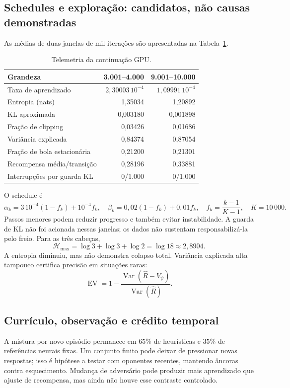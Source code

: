 \documentclass[11pt,a4paper]{article}
\begin{document}
\subsection{Schedules e exploração: candidatos, não causas demonstradas}
As médias de duas janelas de mil iterações são apresentadas na Tabela~\ref{tab:diag}.
\begin{table}[htbp]\centering\small
\caption{Telemetria da continuação GPU.}\label{tab:diag}
\begin{tabular}{@{}lrr@{}}\toprule
Grandeza & 3.001--4.000 & 9.001--10.000\\\midrule
Taxa de aprendizado & $2{,}30003\,10^{-4}$ & $1{,}09991\,10^{-4}$\\
Entropia (nats) & 1,35034 & 1,20892\\
KL aproximada & 0,003180 & 0,001898\\
Fração de clipping & 0,03426 & 0,01686\\
Variância explicada & 0,84374 & 0,87054\\
Fração de bola estacionária & 0,21200 & 0,21301\\
Recompensa média/transição & 0,28196 & 0,33881\\
Interrupções por guarda KL & 0/1.000 & 0/1.000\\\bottomrule
\end{tabular}
\end{table}
O schedule é
\begin{equation}
 \alpha_k=3\,10^{-4}(1-f_k)+10^{-4}f_k,\quad
 \beta_k=0{,}02(1-f_k)+0{,}01f_k,\quad
 f_k=\frac{k-1}{K-1},\quad K=10\,000.
\end{equation}
Passos menores podem reduzir progresso e também evitar instabilidade. A guarda de KL não foi acionada nessas janelas; os dados não sustentam responsabilizá-la pelo freio. Para as três cabeças,
\begin{equation}
 \mathcal H_{\max}=\log3+\log3+\log2=\log18\approx2{,}8904.
\end{equation}
A entropia diminuiu, mas não demonstra colapso total. Variância explicada alta tampouco certifica precisão em situações raras:
\begin{equation}
 \operatorname{EV}=1-\frac{\operatorname{Var}(\widehat R-V_\psi)}{\operatorname{Var}(\widehat R)}.
\end{equation}

\subsection{Currículo, observação e crédito temporal}
A mistura por novo episódio permanece em $65\%$ de heurísticas e $35\%$ de referências neurais fixas. Um conjunto finito pode deixar de pressionar novas respostas; isso é hipótese a testar com oponentes recentes, mantendo âncoras contra esquecimento. Mudança de adversário pode produzir mais aprendizado que ajuste de recompensa, mas ainda não houve esse contraste controlado.
\end{document}
